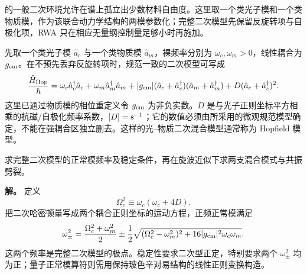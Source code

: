 \begin{exbox}
的一般二次环境允许在谱上孤立出少数材料自由度。这里取一个类光子模和一个类物质模，作为该联合动力学结构的两模参数化；完整二次模型先保留反旋转项与自极化项，RWA 只在相应无量纲控制量足够小时再施加。

先取一个类光子模 $\hat a_c$ 与一个类物质模 $\hat a_m$，裸频率分别为 $\omega_c,\omega_m>0$，线性耦合为 $g_{\rm cm}$。在不预先丢弃反旋转项时，规范一致的二次模型可写成
\begin{equation}
{
\frac{\hat H_{\rm Hop}}{\hbar}
=\omega_c \hat a_c^\dagger\hat a_c+\omega_m \hat a_m^\dagger\hat a_m
+|g_{\rm cm}|(\hat a_c+\hat a_c^\dagger)(\hat a_m+\hat a_m^\dagger)
+D(\hat a_c+\hat a_c^\dagger)^2 .}
\label{eq:hopfield-full-hamiltonian-dp68}
\end{equation}
这里已通过物质模的相位重定义令 $g_{\rm cm}$ 为非负实数。$D$ 是与光子正则坐标平方相乘的抗磁/自极化频率系数，$[D]={\rm s^{-1}}$；它的数值必须由所采用的微观规范模型确定，不能在强耦合区独立删去。这样的光--物质二次混合模型通常称为 Hopfield 模型。

求完整二次模型的正常模频率及稳定条件，再在旋波近似下求两支混合模式与共振劈裂。

\textbf{解。} 定义
\begin{equation*}
\Omega_c^2\equiv\omega_c(\omega_c+4D).
\end{equation*}
把二次哈密顿量写成两个耦合正则坐标的运动方程，正频正常模满足
\begin{equation}
{
\omega_\pm^2
=\frac{\Omega_c^2+\omega_m^2}{2}
\pm\frac12\sqrt{(\Omega_c^2-\omega_m^2)^2
+16|g_{\rm cm}|^2\omega_c\omega_m}.}
\label{eq:hopfield_full_quadratic_frequencies}
\end{equation}
这两个频率是完整二次模型的极点。稳定性要求二次型正定，特别要求两个 $\omega_\pm^2$ 均为正；量子正常模算符则需用保持玻色辛对易结构的线性正则变换构造。


\end{exbox}
